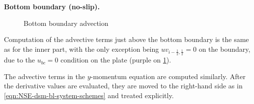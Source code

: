 \documentclass{article}
\begin{document}
\textbf{Bottom boundary (no-slip).}
\begin{figure}[H] %
  \caption{Bottom boundary advection}\label{fig:ADV-bottom}
\end{figure}
Computation of the advective terms just above the bottom boundary is the same as for the inner part, with the only exception being $uv_{i-\frac{1}{2},\frac{1}{2}}=0$ on the boundary, due to the $u_{bc}=0$ condition on the plate (purple on \cref{fig:ADV-bottom}).

The advective terms in the $y$-momentum equation are computed similarly. After the derivative values are evaluated, they are moved to the right-hand side as in \cref{eqn:NSE-dsm-bl-system-schemes} and treated explicitly. 

\end{document}
